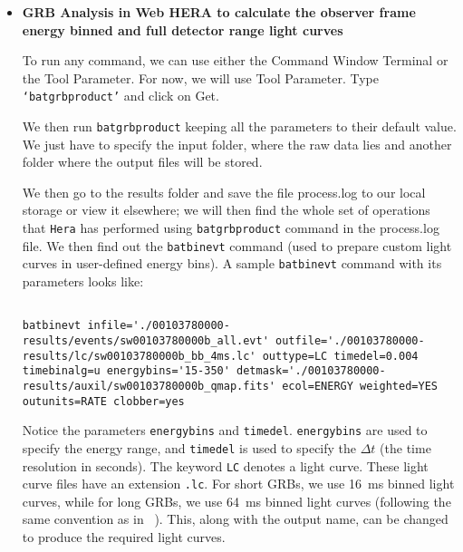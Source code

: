 \documentclass[prd,nofootinbib,preprintnumbers,floatfix]{revtex4}  %
\begin{document}
\begin{itemize}
\item {\bf GRB Analysis in Web HERA to calculate the observer frame energy binned and full detector range light curves}

To run any command, we can use either the Command Window Terminal or the Tool Parameter. For now, we will use Tool Parameter. Type {\tt ‘batgrbproduct’} and click on Get.
\iffalse
\begin{figure}[h]
    \centering
    \texttt{[image: Plots/Dataprocessing/batgrbproduct.pdf]}
    \caption{Figure showing the implementation of {\tt batgrbproduct} command which is used to perform standard processing for gamma-ray bursts detected by the Swift BAT
instrument, including generation of a master quality maps, GTI (Good time interval) files, sky images, computation of mask weights and extraction of events near the GRB position.}
    \label{fig:batgrbproduct}
\end{figure}
\fi

We then run {\tt batgrbproduct} keeping all the parameters to their default value. We just have to specify the input folder, where the raw data lies and another folder where the output files will be stored.

 We then go to the results folder and save the file process.log to our local storage or view it elsewhere; we will then find the whole set of operations that {\tt Hera} has performed using {\tt batgrbproduct} command in the process.log file. We then find out the {\tt batbinevt} command (used to prepare custom light curves in user-defined energy bins). A sample {\tt batbinevt} command with its parameters looks like:
\clearpage

\begin{lstlisting}[breaklines=true]

batbinevt infile='./00103780000-results/events/sw00103780000b_all.evt' outfile='./00103780000-results/lc/sw00103780000b_bb_4ms.lc' outtype=LC timedel=0.004 timebinalg=u energybins='15-350' detmask='./00103780000-results/auxil/sw00103780000b_qmap.fits' ecol=ENERGY weighted=YES outunits=RATE clobber=yes

\end{lstlisting}

Notice the parameters {\tt energybins} and {\tt timedel}. {\tt energybins} are used to specify the energy range, and {\tt timedel} is used to specify the $\Delta t$ (the time resolution in seconds). The keyword {\tt LC} denotes a light curve. These light curve files have an extension {\tt .lc}. For short GRBs, we use 16~ms binned light curves, while for long GRBs, we use 64~ms binned light curves (following the same convention as in ~\cite{Kouveliotou93}). This, along with the output name, can be changed to produce the required light curves.


\end{itemize}
\end{document}
